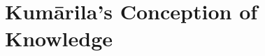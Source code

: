 \documentclass[11pt,letterpaper,oneside]{amsart}
\begin{document}





\section{Kum\=arila's Conception of Knowledge}
\label{conception}



\end{document}
